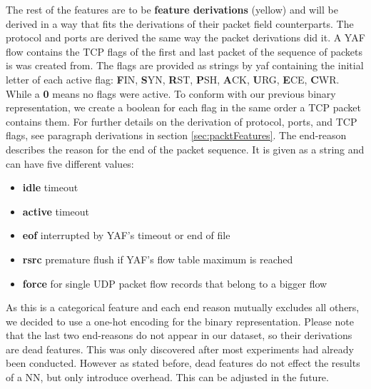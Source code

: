 \documentclass[
	ngerman,
	ruledheaders=section,%
	class=report,%
	thesis={type=bachelor},%
	accentcolor=9c,%
	custommargins=true,%
	marginpar=false,%
	parskip=half-,%
	fontsize=11pt,%
	twoside
]{tudapub}
\begin{document}
The rest of the features are to be \colorbox{derivation}{\textbf{feature derivations} (yellow)} and will be derived in a way that fits the derivations of their packet field counterparts.
The protocol and ports are derived the same way the packet derivations did it.
A YAF flow contains the TCP flags of the first and last packet of the sequence of packets is was created from.
The flags are provided as strings by yaf containing the initial letter of each active flag:
\textbf{F}IN, \textbf{S}YN, \textbf{R}ST, \textbf{P}SH, \textbf{A}CK, \textbf{U}RG, \textbf{E}CE, \textbf{C}WR.
While a \textbf{0} means no flags were active.
To conform with our previous binary representation, we create a boolean for each flag in the same order a TCP packet contains them.
For further details on the derivation of protocol, ports, and TCP flags, see paragraph derivations in section \ref{sec:packtFeatures}.
The end-reason describes the reason for the end of the packet sequence.
It is given as a string and can have five different values:
\begin{itemize}
    \item \textbf{idle} timeout
    \item \textbf{active} timeout
    \item \textbf{eof} interrupted by YAF's timeout or end of file
    \item \textbf{rsrc} premature flush if YAF's flow table maximum is reached
    \item \textbf{force} for single UDP packet flow records that belong to a bigger flow
\end{itemize}
As this is a categorical feature and each end reason mutually excludes all others, we decided to use a one-hot encoding for the binary representation.
Please note that the last two end-reasons do not appear in our dataset, so their derivations are dead features.
This was only discovered after most experiments had already been conducted.
However as stated before, dead features do not effect the results of a NN, but only introduce overhead.
This can be adjusted in the future.


\end{document}
